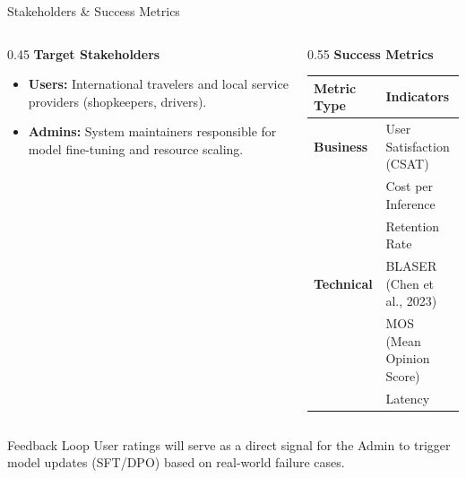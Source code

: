 \documentclass{beamer}
\begin{document}
\begin{frame}{Stakeholders \& Success Metrics}
    \begin{columns}[t]
        \begin{column}{0.45\textwidth}
            \textbf{Target Stakeholders}
            \begin{itemize}
                \item \textbf{Users:} International travelers and local service providers (shopkeepers, drivers).
                \item \textbf{Admins:} System maintainers responsible for model fine-tuning and resource scaling.
            \end{itemize}
        \end{column}

        \pause

        \begin{column}{0.55\textwidth}
            \textbf{Success Metrics}
            \begin{table}[]
                \footnotesize
                \begin{tabular}{@{}ll@{}}
                \toprule
                \textbf{Metric Type} & \textbf{Indicators} \\ \midrule
                \textbf{Business}  & User Satisfaction (CSAT) \\
                                     & Cost per Inference \\
                                     & Retention Rate \\ \midrule
                \textbf{Technical}  & BLASER (Chen et al., 2023) \\
                                    & MOS (Mean Opinion Score) \\
                                    & Latency \\
                                    \bottomrule
                \end{tabular}
            \end{table}
        \end{column}
    \end{columns}

    \vfill
    \begin{block}{Feedback Loop}
        User ratings will serve as a direct signal for the Admin to trigger model updates (SFT/DPO) based on real-world failure cases.
    \end{block}
\end{frame}
\end{document}
